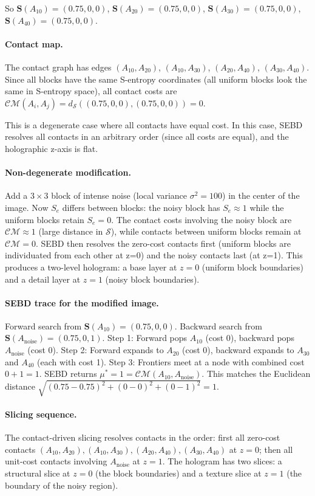 \documentclass[twocolumn]{article}
\theoremstyle{plain}
\theoremstyle{definition}
\newcommand{\CM}{\mathcal{CM}}
\newcommand{\SS}{\mathcal{S}}
\newcommand{\Se}{S_e}
\newcommand{\bS}{\mathbf{S}}
\newcommand{\dS}{d_{\mathcal{S}}}
\begin{document}
So $\bS(A_{10}) = (0.75, 0, 0)$, $\bS(A_{20}) = (0.75, 0, 0)$, $\bS(A_{30}) =
(0.75, 0, 0)$, $\bS(A_{40}) = (0.75, 0, 0)$.

\paragraph{Contact map.} The contact graph has edges $(A_{10}, A_{20})$,
$(A_{10}, A_{30})$, $(A_{20}, A_{40})$, $(A_{30}, A_{40})$. Since all blocks
have the same S-entropy coordinates (all uniform blocks look the same in S-entropy
space), all contact costs are $\CM(A_i, A_j) = \dS((0.75,0,0),(0.75,0,0)) = 0$.

This is a degenerate case where all contacts have equal cost. In this case, SEBD
resolves all contacts in an arbitrary order (since all costs are equal), and
the holographic z-axis is flat.

\paragraph{Non-degenerate modification.} Add a $3\times 3$ block of intense
noise (local variance $\sigma^2 = 100$) in the center of the image. Now $\Se$
differs between blocks: the noisy block has $\Se \approx 1$ while the uniform
blocks retain $\Se = 0$. The contact costs involving the noisy block are
$\CM \approx 1$ (large distance in $\SS$), while contacts between uniform blocks
remain at $\CM = 0$. SEBD then resolves the zero-cost contacts first (uniform
blocks are individuated from each other at z=0) and the noisy contacts last (at
z=1). This produces a two-level hologram: a base layer at $z=0$ (uniform block
boundaries) and a detail layer at $z=1$ (noisy block boundaries).

\paragraph{SEBD trace for the modified image.} Forward search from $\bS(A_{10})
= (0.75, 0, 0)$. Backward search from $\bS(A_{\text{noise}}) = (0.75, 0, 1)$.
Step 1: Forward pops $A_{10}$ (cost 0), backward pops $A_{\text{noise}}$ (cost 0).
Step 2: Forward expands to $A_{20}$ (cost 0), backward expands to $A_{30}$ and
$A_{40}$ (each with cost 1). Step 3: Frontiers meet at a node with combined cost
$0 + 1 = 1$. SEBD returns $\mu^* = 1 = \CM(A_{10}, A_{\text{noise}})$. This
matches the Euclidean distance $\sqrt{(0.75-0.75)^2 + (0-0)^2 + (0-1)^2} = 1$.

\paragraph{Slicing sequence.} The contact-driven slicing resolves contacts in
the order: first all zero-cost contacts $(A_{10}, A_{20}), (A_{10}, A_{30}),
(A_{20}, A_{40}), (A_{30}, A_{40})$ at $z=0$; then all unit-cost contacts
involving $A_{\text{noise}}$ at $z=1$. The hologram has two slices: a structural
slice at $z=0$ (the block boundaries) and a texture slice at $z=1$ (the boundary
of the noisy region).
\end{document}
